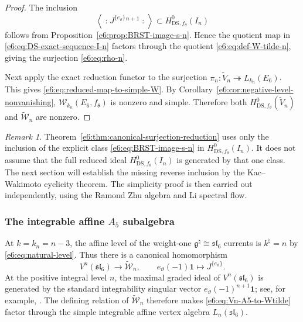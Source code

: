 \documentclass[11pt,reqno]{amsart}
\theoremstyle{definition}
\theoremstyle{remark}
\newtheorem{remark}[theorem]{Remark}
\begin{document}
\begin{proof}
The inclusion
\[
  \left\langle
    \mathopen{:}J^{\{e_\vartheta\}}{}^{n+1}\mathclose{:}
  \right\rangle
  \subset H^0_{\mathrm{DS},f_\theta}(I_n)
\]
follows from Proposition~\ref{e6:prop:BRST-image-s-n}.  Hence the quotient map in
\eqref{e6:eq:DS-exact-sequence-I-n} factors through the quotient
\eqref{e6:eq:def-W-tilde-n}, giving the surjection \eqref{e6:eq:rho-n}.

Next apply the exact reduction functor to the surjection
$\pi_n:\widetilde V_n\twoheadrightarrow L_{k_n}(E_6)$.  This gives
\eqref{e6:eq:reduced-map-to-simple-W}.  By
Corollary~\ref{e6:cor:negative-level-nonvanishing},
$\mathcal W_{k_n}(E_6,f_\theta)$ is nonzero and simple.  Therefore both
$H^0_{\mathrm{DS},f_\theta}(\widetilde V_n)$ and
$\widetilde{\mathcal W}_n$ are nonzero.
\end{proof}

\begin{remark}
Theorem~\ref{e6:thm:canonical-surjection-reduction} uses only the inclusion of the
explicit class \eqref{e6:eq:BRST-image-s-n} in
$H^0_{\mathrm{DS},f_\theta}(I_n)$.  It does not assume that the full reduced ideal
$H^0_{\mathrm{DS},f_\theta}(I_n)$ is generated by that one class.  The next section will establish the missing reverse inclusion by the
Kac--Wakimoto cyclicity theorem.  The simplicity proof is then carried out
independently, using the Ramond Zhu algebra and Li spectral flow.
\end{remark}

\subsubsection{The integrable affine \texorpdfstring{$A_5$}{A5} subalgebra}


At $k=k_n=n-3$, the affine level of the weight-one
$\mathfrak g^\natural\cong\mathfrak{sl}_6$ currents is $k^\natural=n$ by
\eqref{e6:eq:natural-level}.  Thus there is a canonical homomorphism
\begin{equation}\label{e6:eq:Vn-A5-to-Wtilde}
  V^n(\mathfrak{sl}_6)\longrightarrow\widetilde{\mathcal W}_n,
  \qquad
  e_\vartheta(-1)\mathbf1
  \longmapsto J^{\{e_\vartheta\}}.
\end{equation}
At the positive integral level $n$, the maximal graded ideal of
$V^n(\mathfrak{sl}_6)$ is generated by the standard integrability singular vector
$e_\vartheta(-1)^{n+1}\mathbf1$; see, for example, \cite{Kac1998}.  The defining
relation of $\widetilde{\mathcal W}_n$ therefore makes
\eqref{e6:eq:Vn-A5-to-Wtilde} factor through the simple integrable affine vertex
algebra $L_n(\mathfrak{sl}_6)$.
\end{document}
